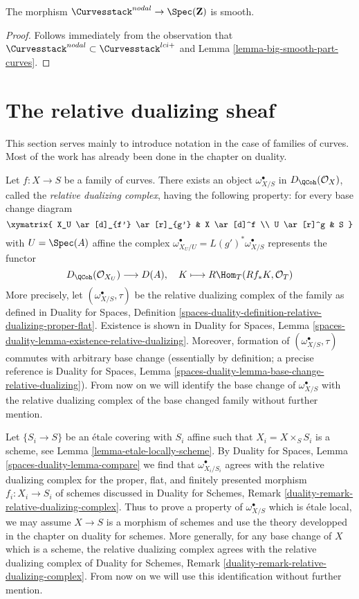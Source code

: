\begin{lemma}
\label{lemma-nodal-curves-smooth}
The morphism $\Curvesstack^{nodal} \to \Spec(\mathbf{Z})$ is smooth.
\end{lemma}

\begin{proof}
Follows immediately from the observation that
$\Curvesstack^{nodal} \subset \Curvesstack^{lci+}$
and Lemma \ref{lemma-big-smooth-part-curves}.
\end{proof}




\section{The relative dualizing sheaf}
\label{section-relative-dualizing}

\noindent
This section serves mainly
to introduce notation in the case of families of curves.
Most of the work has already been done in the chapter on duality.

\medskip\noindent
Let $f : X \to S$ be a family of curves. There exists an object
$\omega_{X/S}^\bullet$ in $D_\QCoh(\mathcal{O}_X)$,
called the {\it relative dualizing complex}, having the following
property: for every base change diagram
$$
\xymatrix{
X_U \ar[d]_{f'} \ar[r]_{g'} & X \ar[d]^f \\
U \ar[r]^g & S
}
$$
with $U = \Spec(A)$ affine the complex
$\omega_{X_U/U}^\bullet = L(g')^*\omega_{X/S}^\bullet$
represents the functor
$$
D_\QCoh(\mathcal{O}_{X_U}) \longrightarrow D(A),\quad
K \longmapsto R\Hom_T(Rf_*K, \mathcal{O}_T)
$$
More precisely, let $(\omega_{X/S}^\bullet, \tau)$
be the relative dualizing complex of the family as defined in
Duality for Spaces, Definition
\ref{spaces-duality-definition-relative-dualizing-proper-flat}.
Existence is shown in Duality for Spaces, Lemma
\ref{spaces-duality-lemma-existence-relative-dualizing}.
Moreover, formation of $(\omega_{X/S}^\bullet, \tau)$ commutes
with arbitrary base change (essentially by definition; a precise
reference is Duality for Spaces, Lemma
\ref{spaces-duality-lemma-base-change-relative-dualizing}).
From now on we will identify the base change of
$\omega_{X/S}^\bullet$ with the relative dualizing
complex of the base changed family without further mention.

\medskip\noindent
Let $\{S_i \to S\}$ be an \'etale covering with $S_i$ affine such that
$X_i = X \times_S S_i$ is a scheme, see Lemma \ref{lemma-etale-locally-scheme}.
By Duality for Spaces, Lemma \ref{spaces-duality-lemma-compare}
we find that $\omega_{X_i/S_i}^\bullet$ agrees with
the relative dualizing complex for the proper, flat, and
finitely presented morphism $f_i : X_i \to S_i$ of schemes
discussed in Duality for Schemes, Remark
\ref{duality-remark-relative-dualizing-complex}.
Thus to prove a property of $\omega_{X/S}^\bullet$
which is \'etale local, we may assume $X \to S$ is a morphism of schemes
and use the theory developped in the chapter on duality for schemes.
More generally, for any base change of $X$ which is a scheme,
the relative dualizing complex agrees with the
relative dualizing complex of Duality for Schemes, Remark
\ref{duality-remark-relative-dualizing-complex}.
From now on we will use this identification without further mention.

